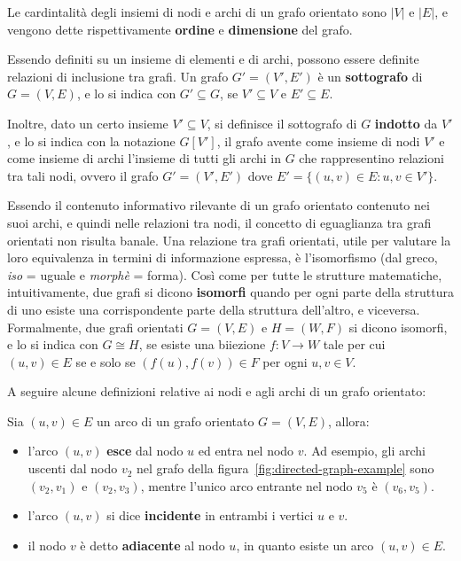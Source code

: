 Le cardintalit\`a degli insiemi di nodi e archi di un grafo orientato sono $|V|$ e $|E|$,
e vengono dette rispettivamente \textbf{ordine} e \textbf{dimensione} del grafo.

Essendo definiti su un insieme di elementi e di archi, possono essere definite relazioni di inclusione tra grafi.
Un grafo $G' = (V', E')$ \`e un \textbf{sottografo} di $G = (V, E)$, e lo si indica con $G' \subseteq G$, se $V' \subseteq V$
e $E' \subseteq E$.

Inoltre, dato un certo insieme $V' \subseteq V$, si definisce il sottografo di $G$ \textbf{indotto}
da $V'$, e lo si indica con la notazione $G[V']$, il grafo avente come insieme di nodi $V'$ e come insieme di archi
l'insieme di tutti gli archi in $G$ che rappresentino relazioni tra tali nodi, ovvero il grafo $G' = (V', E')$ dove
$E' = \{ (u, v) \in E : u, v \in V'\}$.

Essendo il contenuto informativo rilevante di un grafo orientato contenuto nei suoi archi, e quindi nelle relazioni
tra nodi, il concetto di eguaglianza tra grafi orientati non risulta banale.
Una relazione tra grafi orientati, utile per valutare la loro equivalenza in termini di informazione espressa,
\`e l'isomorfismo (dal greco, \textit{iso} = uguale e \textit{morph\`e} = forma).
Così come per tutte le strutture matematiche, intuitivamente, due grafi si dicono \textbf{isomorfi} quando per ogni
parte della struttura di uno esiste una corrispondente parte della struttura dell'altro, e viceversa.
Formalmente, due grafi orientati $G = (V, E)$ e $H = (W, F)$ si dicono isomorfi, e lo si indica con $G \cong H$, se
esiste una biiezione $f: V \rightarrow W$ tale per cui $(u, v) \in E$ se e solo se $(f(u), f(v)) \in F$ per ogni
$u, v \in V$.

\label{par:archi-e-nodi-di-un-grafo-orientato}

A seguire alcune definizioni relative ai nodi e agli archi di un grafo orientato: \newline

Sia $(u, v) \in E$ un arco di un grafo orientato $G = (V, E)$, allora:
\begin{itemize}
    \item l'arco $(u, v)$ \textbf{esce} dal nodo $u$ ed {entra} nel nodo $v$.
        Ad esempio, gli archi uscenti dal nodo $v_2$ nel grafo della figura~\ref{fig:directed-graph-example}
        sono $(v_2, v_1)$ e $(v_2, v_3)$, mentre l'unico arco entrante nel nodo $v_5$ \`e $(v_6, v_5)$.
    \item l'arco $(u, v)$ si dice \textbf{incidente} in entrambi i vertici $u$ e $v$.
    \item il nodo $v$ \`e detto \textbf{adiacente} al nodo $u$, in quanto esiste un arco $(u, v) \in E$.
\end{itemize}

